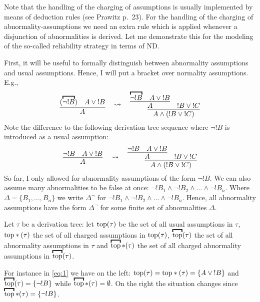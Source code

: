 Note that the handling of the charging of assumptions is
usually implemented by means of deduction rules (see Prawitz
p.\ 23). For the handling of the charging of
abnormality-assumptions we need an extra rule which is
applied whenever a disjunction of abnormalities is
derived. Let me demonstrate this for the modeling of the
so-called reliability strategy in terms of ND. 

First, it will be useful to formally distinguish between
abnormality assumptions and usual assumptions. Hence, I will
put a bracket over normality assumptions. E.g.,
\begin{equation}\label{eq:1}
  \vcenter{\infer{A}{(\overbracket{\neg !B}) & A \vee {!}B}} ~~~\leadsto~~~ %
  \vcenter{\infer{A \wedge (!B \vee
      {!}C)}{\infer{A}{\overbracket{\neg !B} 
        & A \vee {!}B} & !B \vee {!}C}}
\end{equation}
Note the difference to the following derivation tree sequence
where $\neg !B$ is introduced as a usual assumption:
\begin{equation*}
  \vcenter{\infer{A}{\neg !B & A \vee {!}B}} ~~~\leadsto~~~ %
  \vcenter{\infer{A \wedge (!B \vee
      {!}C)}{\infer{A}{\neg !B 
        & A \vee {!}B} & !B \vee {!}C}}
\end{equation*}
So far, I only allowed for abnormality assumptions of the
form $\neg !B$. We can also assume many abnormalities to be
false at once: $\neg !B_1 \wedge \neg !B_2 \wedge \ldots
\wedge \neg !B_n$. Where $\Delta = \{B_1, \ldots, B_n\}$ we
write $\Delta^\neg$ for $\neg !B_1 \wedge \neg !B_2 \wedge
\ldots \wedge \neg !B_n$. Hence, all abnormality assumptions
have the form $\Delta^\neg$ for some finite set of
abnormalities $\Delta$.


Let $\tau$ be a derivation tree: let ${\rm top}(\tau)$ be the
set of all usual assumptions in $\tau$, ${\rm top}*(\tau)$
the set of all charged assumptions in ${\rm top}(\tau)$,
$\overbracket{\rm top}(\tau)$ the set of all abnormality
assumptions in $\tau$ and $\overbracket{\rm top}*(\tau)$ the
set of all charged abnormality assumptions in
$\overbracket{\rm top}(\tau)$.

For instance in \eqref{eq:1} we have on the left: ${\rm
  top}(\tau) = {\rm top}*(\tau) = \{A \vee {!}B\}$ and
$\overbracket{\rm top}(\tau) = \{\neg !B\}$ while
$\overbracket{\rm top}*(\tau) = \emptyset$. On the right the
situation changes since $\overbracket{\rm top}*(\tau) =
\{\neg ! B\}$.


